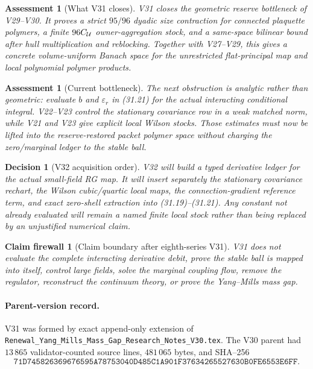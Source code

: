 \documentclass[11pt,oneside]{book}
\newtheorem{assessment}[theorem]{Assessment}
\newtheorem{firewall}[theorem]{Claim firewall}
\newtheorem{decision}[theorem]{Decision}
\theoremstyle{definition}
\theoremstyle{remark}
\begin{document}
\begin{assessment}[What V31 closes]
\label{ass:e8v31-closes}
V31 closes the geometric reserve bottleneck of V29--V30.  It proves a
strict \(95/96\) dyadic size contraction for connected plaquette
polymers, a finite \(96C_{\cal U}\) owner-aggregation stock, and a
same-space bilinear bound after hull multiplication and reblocking.
Together with V27--V29, this gives a concrete volume-uniform Banach
space for the unrestricted flat-principal map and local polynomial
polymer products.
\end{assessment}

\begin{assessment}[Current bottleneck]
\label{ass:e8v31-remains}
The next obstruction is analytic rather than geometric: evaluate
\(b\) and \(\varepsilon_r\) in (31.21) for the actual interacting
conditional integral.  V22--V23 control the stationary covariance
row in a weak matched norm, while V21 and V23 give explicit local
Wilson stocks.  Those estimates must now be lifted into the
reserve-restored packet polymer space without charging the
zero/marginal ledger to the stable ball.
\end{assessment}

\begin{decision}[V32 acquisition order]
\label{dec:e8v31-v32}
V32 will build a typed derivative ledger for the actual small-field RG
map.  It will insert separately the stationary covariance rechart,
the Wilson cubic/quartic local maps, the connection-gradient reference
term, and exact zero-shell extraction into (31.19)--(31.21).  Any
constant not already evaluated will remain a named finite local stock
rather than being replaced by an unjustified numerical claim.
\end{decision}

\begin{firewall}[Claim boundary after eighth-series V31]
\label{fire:e8v31-claim}
V31 does not evaluate the complete interacting derivative debit,
prove the stable ball is mapped into itself, control large fields,
solve the marginal coupling flow, remove the regulator, reconstruct
the continuum theory, or prove the Yang--Mills mass gap.
\end{firewall}

\paragraph{Parent-version record.}
V31 was formed by exact append-only extension of
\texttt{Renewal\_Yang\_Mills\_Mass\_Gap\_Research\_Notes\_V30.tex}.
The V30 parent had \(13\,865\) validator-counted source lines,
\(481\,065\) bytes, and SHA--256
\[
\texttt{71D745826369676595A78753040D485C1A901F37634265527630B0FE6553E6FF}.
\]
\end{document}
